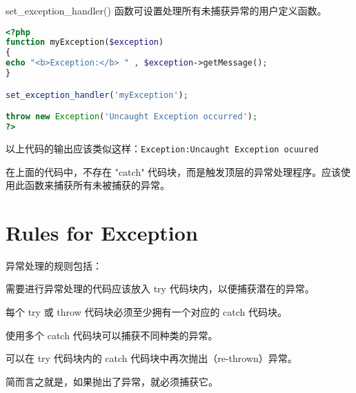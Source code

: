 set\_exception\_handler() 函数可设置处理所有未捕获异常的用户定义函数。

\begin{lstlisting}[language=PHP]
<?php
function myException($exception)
{
echo "<b>Exception:</b> " , $exception->getMessage();
}

set_exception_handler('myException');

throw new Exception('Uncaught Exception occurred');
?>
\end{lstlisting}

以上代码的输出应该类似这样：\verb|Exception:Uncaught Exception ocuured|

在上面的代码中，不存在 "catch" 代码块，而是触发顶层的异常处理程序。应该使用此函数来捕获所有未被捕获的异常。





\section{Rules for Exception}

异常处理的规则包括：

\begin{compactitem}
\item 需要进行异常处理的代码应该放入 try 代码块内，以便捕获潜在的异常。
\item 每个 try 或 throw 代码块必须至少拥有一个对应的 catch 代码块。
\item 使用多个 catch 代码块可以捕获不同种类的异常。
\item 可以在 try 代码块内的 catch 代码块中再次抛出（re-thrown）异常。
\end{compactitem}

简而言之就是，如果抛出了异常，就必须捕获它。





\clearpage














































































